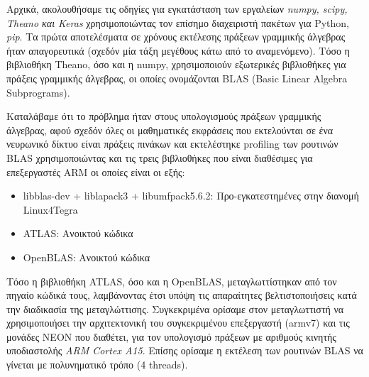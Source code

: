 Αρχικά, ακολουθήσαμε τις οδηγίες για εγκατάσταση των εργαλείων \emph{numpy, scipy, Theano και Keras}
χρησιμοποιώντας τον επίσημο διαχειριστή πακέτων για Python, \emph{pip}.
Τα πρώτα αποτελέσματα σε χρόνους εκτέλεσης πράξεων γραμμικής άλγεβρας ήταν
απαγορευτικά (σχεδόν μία τάξη μεγέθους κάτω από το αναμενόμενο).
Τόσο η βιβλιοθήκη Theano, όσο και η numpy, χρησιμοποιούν εξωτερικές βιβλιοθήκες
για πράξεις γραμμικής άλγεβρας, οι οποίες ονομάζονται BLAS (Basic Linear Algebra Subprograms).

Καταλάβαμε ότι το πρόβλημα ήταν στους υπολογισμούς πράξεων γραμμικής άλγεβρας,
αφού σχεδόν όλες οι μαθηματικές εκφράσεις που εκτελούνται σε ένα
νευρωνικό δίκτυο είναι πράξεις πινάκων και εκτελέστηκε profiling των
ρουτινών BLAS χρησιμοποιώντας και τις τρεις βιβλιοθήκες που είναι διαθέσιμες για
επεξεργαστές ARM οι οποίες είναι οι εξής:
\begin{itemize}
  \item{libblas-dev + liblapack3 + libumfpack5.6.2: Προ-εγκατεστημένες στην διανομή Linux4Tegra}
  \item{ATLAS: Ανοικτού κώδικα}
  \item{OpenBLAS: Ανοικτού κώδικα}
\end{itemize}

Τόσο η βιβλιοθήκη ATLAS, όσο και η OpenBLAS, μεταγλωττίστηκαν από τον πηγαίο κώδικά τους,
λαμβάνοντας έτσι υπόψη τις απαραίτητες βελτιστοποιήσεις κατά την διαδικασία
της μεταγλώττισης. 
Συγκεκριμένα ορίσαμε στον μεταγλωττιστή να χρησιμοποιήσει την αρχιτεκτονική του
συγκεκριμένου επεξεργαστή (armv7) και τις μονάδες
NEON που διαθέτει, για τον υπολογισμό πράξεων με αριθμούς κινητής %
υποδιαστολής \emph{ARM Cortex A15}. Επίσης ορίσαμε η εκτέλεση των ρουτινών
BLAS να γίνεται με πολυνηματικό τρόπο (4 threads).

